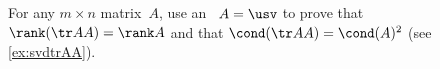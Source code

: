 \begin{exercise} \label{ex:ctrAA} 
For any \(m\times n\) matrix~\(A\), use an \svd\ \(A=\usv\) to prove that \(\rank(\tr AA)=\rank A\) and that \(\cond(\tr AA)=\cond(A)^2\)
(see \autoref{ex:svdtrAA}).
\end{exercise}





%





